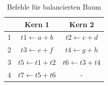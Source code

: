 \begin{table}
	\begin{center}
		\begin{tabular}{|c|c|c|}
			\hline  & Kern 1 & Kern 2 \\ 
			\hline 1 & $ t1 \leftarrow a + b $ & $ t2 \leftarrow c + d $ \\ 
			\hline 2 & $ t3 \leftarrow e + f $ & $ t4 \leftarrow g + h $ \\ 
			\hline 3 & $ t5 \leftarrow t1 + t2 $ & $ t6 \leftarrow t3 + t4 $\\ 
			\hline 4 & $ t7 \leftarrow t5 + t6 $ &  -\\ 
			\hline 
		\end{tabular}
	\end{center}
	\caption{Befehle für balancierten Baum}
	\label{tab:balancierter-baum}
\end{table}



